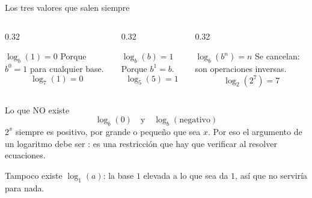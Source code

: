 \documentclass[aspectratio=169,10pt]{beamer}
\begin{document}
\begin{frame}{Los tres valores que salen siempre}
  \scriptsize
  \begin{columns}[T,onlytextwidth]
    \begin{column}{0.32\textwidth}
      \begin{block}{$\log_{b}(1) = 0$}
        \tiny
        Porque $b^{0}=1$ para cualquier base.
        \[ \log_{7}(1)=0 \]
      \end{block}
    \end{column}
    \begin{column}{0.32\textwidth}
      \begin{block}{$\log_{b}(b) = 1$}
        \tiny
        Porque $b^{1}=b$.
        \[ \log_{5}(5)=1 \]
      \end{block}
    \end{column}
    \begin{column}{0.32\textwidth}
      \begin{block}{$\log_{b}(b^{n}) = n$}
        \tiny
        Se cancelan: son operaciones inversas.
        \[ \log_{2}(2^{7})=7 \]
      \end{block}
    \end{column}
  \end{columns}

  \vspace{0.12cm}
  \begin{alertblock}{Lo que NO existe}
    \tiny
    \[ \log_{b}(0) \quad\text{y}\quad \log_{b}(\text{negativo}) \]
     $2^{x}$ siempre es positivo, por grande o pequeño que
    sea $x$. Por eso el argumento de un logaritmo debe ser : es una restricción que hay que verificar al resolver
    ecuaciones.
  \end{alertblock}

  \vspace{0.06cm}
  {\tiny\color{uniGris} Tampoco existe $\log_{1}(a)$: la base $1$ elevada a lo
  que sea da $1$, así que no serviría para nada.}
\end{frame}
\end{document}

